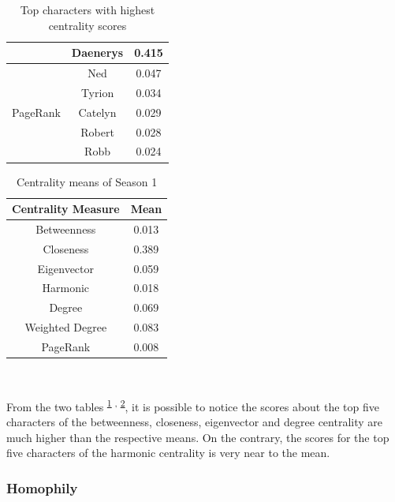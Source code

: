 \documentclass[10pt,twocolumn,letterpaper]{article}
\begin{document}
\begin{table}[!h]
\begin{tabular}{c|c|c}
                    & Daenerys & 0.415 \\
        \hline
                    & Ned & 0.047 \\
                    & Tyrion & 0.034 \\
        PageRank    & Catelyn & 0.029 \\
                    & Robert & 0.028 \\
                    & Robb & 0.024 \\
        \hline
    \end{tabular}
    \vspace{0.2cm}
    \caption{Top characters with highest centrality scores}
    \label{tab:cent_s1}
\end{table}






\begin{table}[!h]
    \centering
    \small
    \begin{tabular}{c|c}
        Centrality Measure & Mean  \\
        \hline
        Betweenness & 0.013 \\
        Closeness & 0.389 \\
        Eigenvector & 0.059 \\
        Harmonic & 0.018 \\
        Degree & 0.069 \\
        Weighted Degree & 0.083 \\
        PageRank & 0.008 \\
        \hline 
    \end{tabular} \\
    \caption{Centrality means of Season 1}
    \label{tab:mcent_s1}
\end{table}

\newpage

From the two tables \textsuperscript{\ref{tab:cent_s1} , \ref{tab:mcent_s1}}, it is possible to notice the scores about the top five characters of the betweenness, closeness, eigenvector and degree centrality are much higher than the respective means. On
the contrary, the scores for the top five characters of the harmonic centrality is very near to the mean.

\subsubsection{Homophily}
\end{document}
